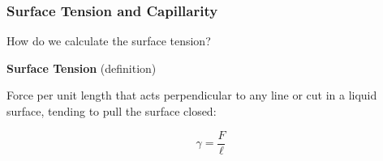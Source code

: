 \documentclass[]{beamer}
\begin{document}
\begin{frame}

\frametitle{Surface Tension and Capillarity}


\textcolor{mypink1}{How do we calculate the surface tension?}


\vspace{3mm}

\pause
\textbf{Surface Tension} (definition)

\vspace{3mm}

Force per unit length that acts perpendicular to any line or cut in a liquid surface, tending to pull the surface closed:

\vspace{3mm}
\pause

\begin{equation}
\boxed{\gamma=\frac{F}{\ell}}
\end{equation}



 \end{frame}





\end{document}
